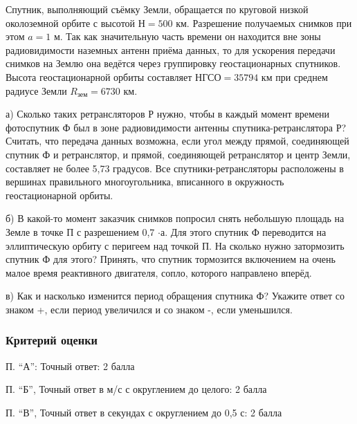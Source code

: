 
Спутник, выполняющий съёмку Земли, обращается по круговой низкой околоземной орбите с высотой $Н=500$ км. 
Разрешение получаемых снимков при этом $a=1$ м. Так как значительную часть времени он находится вне зоны 
радиовидимости наземных антенн приёма данных, то для ускорения передачи снимков на Землю она ведётся 
через группировку геостационарных спутников. Высота геостационарной орбиты составляет $\text{НГСО} = 35794$ 
км при среднем радиусе Земли $R_{\text{зем}} = 6730$ км. 

а) Сколько таких ретрансляторов Р нужно, чтобы в каждый момент времени фотоспутник Ф 
был в зоне радиовидимости антенны спутника-ретранслятора Р? Считать, что передача данных возможна, 
если угол между прямой, соединяющей спутник Ф и ретранслятор, и прямой, соединяющей ретранслятор и центр 
Земли, составляет не более 5,73 градусов. Все спутники-ретрансляторы расположены в вершинах правильного 
многоугольника, вписанного в окружность геостационарной орбиты.

б) В какой-то момент заказчик снимков попросил снять небольшую площадь на Земле в точке П с разрешением 0,7 $\cdot$а. 
Для этого спутник Ф переводится на эллиптическую орбиту с перигеем над точкой П. На сколько нужно затормозить спутник Ф для этого? 
Принять, что спутник тормозится включением на очень малое время реактивного двигателя, 
сопло, которого направлено вперёд.

в) Как и насколько изменится период обращения спутника Ф? Укажите ответ со знаком +, 
если период увеличился и со знаком -, если уменьшился.

\subsubsection*{Критерий оценки}

П. “А”: Точный ответ: 2 балла

П. “Б”, Точный ответ в м/с с округлением до целого: 2 балла

П. “В”, Точный ответ в секундах с округлением до 0,5 с: 2 балла